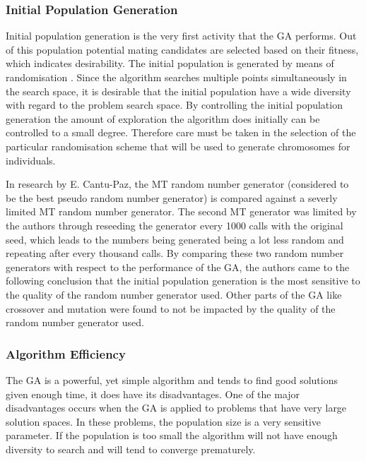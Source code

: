 \subsubsection{Initial Population Generation}
Initial population generation is the very first activity that the \gls{GA} performs. Out of this population potential mating candidates are selected based on their fitness, which indicates desirability. The initial population is generated by means of randomisation \cite{SelfAdaptiveGA}. Since the algorithm searches multiple points simultaneously in the search space, it is desirable that the initial population have a wide diversity with regard to the problem search space\cite{CombinedBranchBoundGA,DistributedHierarchicalGA}. By controlling the initial population generation the amount of exploration the algorithm does initially can be controlled to a small degree\cite{CombinedBranchBoundGA}. Therefore care must be taken in the selection of the particular randomisation scheme that will be used to generate chromosomes for individuals.

In research by E. Cantu-Paz, the \gls{MT} random number generator (considered to be the best pseudo random number generator) is compared against a severly limited \gls{MT} random number generator\cite{OnRandomGA}. The second \gls{MT} generator was limited by the authors through reseeding the generator every 1000 calls with the original seed, which leads to the numbers being generated being a lot less random and repeating after every thousand calls\cite{OnRandomGA, RLRandomGA}. By comparing these two random number generators with respect to the performance of the \gls{GA}, the authors came to the following conclusion that the initial population generation is the most sensitive to the quality of the random number generator used\cite{OnRandomGA}. Other parts of the \gls{GA} like crossover and mutation were found to not be impacted by the quality of the random number generator used\cite{OnRandomGA, RLRandomGA}.

\subsubsection{Algorithm Efficiency}
The \gls{GA} is a powerful, yet simple algorithm and tends to find good solutions given enough time, it does have its disadvantages. One of the major disadvantages occurs when the \gls{GA} is applied to problems that have very large solution spaces. In these problems, the population size is a very sensitive parameter\cite{AdaptiveSAGA,HetergeneousGA,SelfAdaptiveDataMiningGA,PatternDetectionGA}. If the population is too small the algorithm will not have enough diversity to search and will tend to converge prematurely. 

